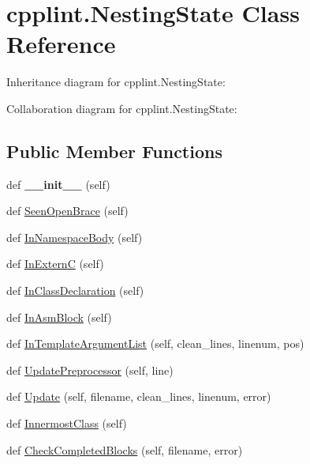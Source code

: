 \hypertarget{classcpplint_1_1NestingState}{}\section{cpplint.\+Nesting\+State Class Reference}
\label{classcpplint_1_1NestingState}


Inheritance diagram for cpplint.\+Nesting\+State\+:


Collaboration diagram for cpplint.\+Nesting\+State\+:
\subsection*{Public Member Functions}
\begin{DoxyCompactItemize}
\item 
\mbox{\label{classcpplint_1_1NestingState_a47e1ad559b9c7304f53d19ef6ebedab4}} 
def {\bfseries \+\_\+\+\_\+init\+\_\+\+\_\+} (self)
\item 
def \hyperlink{classcpplint_1_1NestingState_a15abc0719a22ca8fbb7a8235f0e22b3e}{Seen\+Open\+Brace} (self)
\item 
def \hyperlink{classcpplint_1_1NestingState_a1a06f50d53cfe11b1f78d45b531e0c32}{In\+Namespace\+Body} (self)
\item 
def \hyperlink{classcpplint_1_1NestingState_a67aa1907d42b8408c227ff18537071c7}{In\+ExternC} (self)
\item 
def \hyperlink{classcpplint_1_1NestingState_a8e111c25149c41bd8927606244965b3c}{In\+Class\+Declaration} (self)
\item 
def \hyperlink{classcpplint_1_1NestingState_aa35a529052e4863a477eae649ce778d2}{In\+Asm\+Block} (self)
\item 
def \hyperlink{classcpplint_1_1NestingState_a8f4e9ba1aaa0459de2bedd966e7a2b54}{In\+Template\+Argument\+List} (self, clean\+\_\+lines, linenum, pos)
\item 
def \hyperlink{classcpplint_1_1NestingState_ac3d509c536af445e8ab6b17b067b53f1}{Update\+Preprocessor} (self, line)
\item 
def \hyperlink{classcpplint_1_1NestingState_a3adead8c1575b98ace5c5230f3772c1e}{Update} (self, filename, clean\+\_\+lines, linenum, error)
\item 
def \hyperlink{classcpplint_1_1NestingState_a4141768e75b16698463670caaa587120}{Innermost\+Class} (self)
\item 
def \hyperlink{classcpplint_1_1NestingState_a7bde5ab65152b4073763b1bd17cba567}{Check\+Completed\+Blocks} (self, filename, error)
\end{DoxyCompactItemize}
